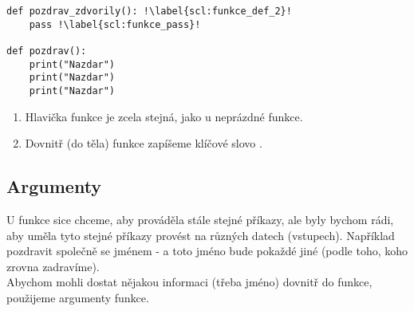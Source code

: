 \begin{minipage}[t]{.45\textwidth}
\begin{code}
\begin{verbatim}
def pozdrav_zdvorily(): !\label{scl:funkce_def_2}!
	pass !\label{scl:funkce_pass}!
	
def pozdrav():	
	print("Nazdar") 
	print("Nazdar")
	print("Nazdar") 

\end{verbatim}

\label{code:funkce_prazdna}
\end{code}
\end{minipage}
\begin{minipage}[t]{.45\textwidth}
\begin{enumerate}
\item[ř. \ref{scl:funkce_def_2}:] Hlavička funkce je zcela stejná, jako u neprázdné funkce.
\item[ř. \ref{scl:funkce_pass}:] Dovnitř (do těla) funkce zapíšeme klíčové slovo .
\end{enumerate}
\end{minipage}

\subsection{Argumenty}
U funkce sice chceme, aby prováděla stále stejné příkazy, ale byly bychom rádi, aby uměla tyto stejné příkazy provést na různých datech (vstupech). Například pozdravit společně se jménem - a toto jméno bude pokaždé jiné (podle toho, koho zrovna zadravíme).\\
Abychom mohli dostat nějakou informaci (třeba jméno) dovnitř do funkce, použijeme argumenty funkce.\\

